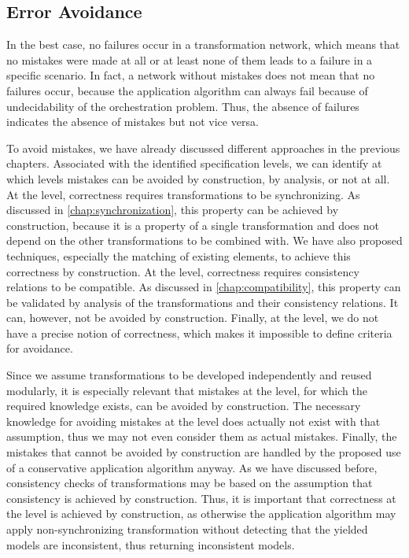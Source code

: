 \subsection{Error Avoidance}

In the best case, no failures occur in a transformation network, which means that no mistakes were made at all or at least none of them leads to a failure in a specific scenario.
In fact, a network without mistakes does not mean that no failures occur, because the application algorithm can always fail because of undecidability of the orchestration problem.
Thus, the absence of failures indicates the absence of mistakes but not vice versa.

To avoid mistakes, we have already discussed different approaches in the previous chapters.
Associated with the identified specification levels, we can identify at which levels mistakes can be avoided by construction, by analysis, or not at all.
At the \leveltransformation level, correctness requires transformations to be synchronizing.
As discussed in \autoref{chap:synchronization}, this property can be achieved by construction, because it is a property of a single transformation and does not depend on the other transformations to be combined with.
We have also proposed techniques, especially the matching of existing elements, to achieve this correctness by construction.
At the \levelnetworkrelation level, correctness requires consistency relations to be compatible.
As discussed in \autoref{chap:compatibility}, this property can be validated by analysis of the transformations and their consistency relations.
It can, however, not be avoided by construction.
Finally, at the \levelnetworkrule level, we do not have a precise notion of correctness, which makes it impossible to define criteria for avoidance.

Since we assume transformations to be developed independently and reused modularly, it is especially relevant that mistakes at the \leveltransformation level, for which the required knowledge exists, can be avoided by construction.
The necessary knowledge for avoiding mistakes at the \levelnetworkrelation level does actually not exist with that assumption, thus we may not even consider them as actual mistakes.
Finally, the mistakes that cannot be avoided by construction are handled by the proposed use of a conservative application algorithm anyway.
As we have discussed before, consistency checks of transformations may be based on the assumption that consistency is achieved by construction.
Thus, it is important that correctness at the \leveltransformation level is achieved by construction, as otherwise the application algorithm may apply non-synchronizing transformation without detecting that the yielded models are inconsistent, thus returning inconsistent models.

